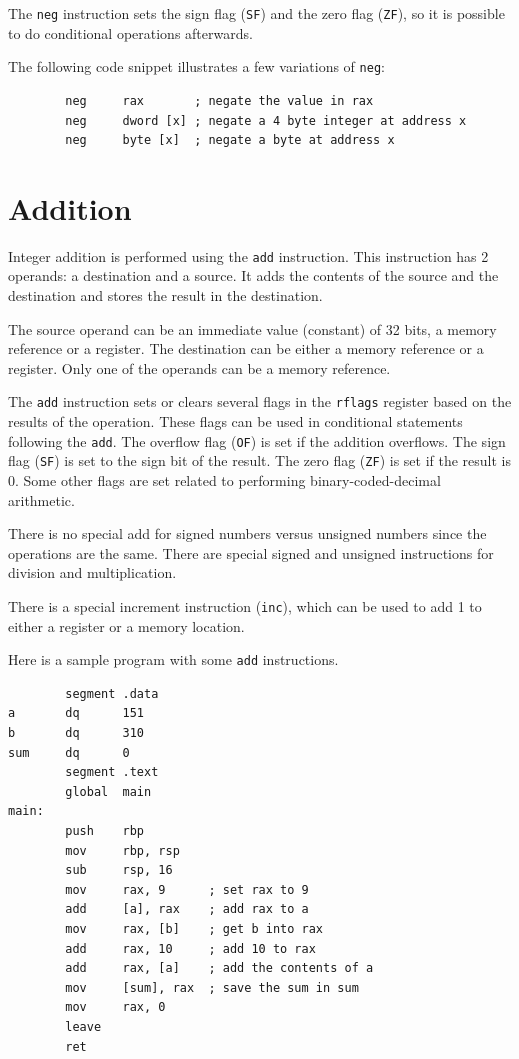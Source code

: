 \documentclass[11pt,b5paper]{book}
\begin{document}
The {\tt neg} instruction sets the sign flag ({\tt SF}) and the zero flag   
({\tt ZF}), so it is possible to do conditional operations afterwards.

The following code snippet illustrates a few variations of {\tt neg}:

\begin{verbatim}
        neg     rax       ; negate the value in rax
        neg     dword [x] ; negate a 4 byte integer at address x
        neg     byte [x]  ; negate a byte at address x
\end{verbatim}

\section{Addition}

Integer addition is performed using the {\tt add} instruction. 
This instruction has 2 operands: a destination and a source.
It adds the contents of the source and the destination and stores the
result in the destination.

The source operand can be an immediate value (constant) of 32 bits, a memory
reference or a register.
The destination can be either a memory reference or a register.
Only one of the operands can be a memory reference.

The {\tt add} instruction sets or clears several flags in the {\tt rflags}  
register based on the results of the operation.
These flags can be used in conditional statements following the {\tt add}.
The overflow flag ({\tt OF}) is set if the addition overflows. 
The sign flag ({\tt SF}) is set to the sign bit of the result. 
The zero flag ({\tt ZF}) is set if the result is 0. 
Some other flags are set related to performing binary-coded-decimal
arithmetic.

There is no special add for signed numbers versus unsigned numbers since
the operations are the same.
There are special signed and unsigned instructions for division and multiplication.

There is a special increment instruction ({\tt inc}), which can be used to 
add 1 to either a register or a memory location.

Here is a sample program with some {\tt add} instructions.
\begin{verbatim}
        segment .data
a       dq      151
b       dq      310
sum     dq      0
        segment .text
        global  main
main:
        push    rbp
        mov     rbp, rsp
        sub     rsp, 16
        mov     rax, 9      ; set rax to 9
        add     [a], rax    ; add rax to a
        mov     rax, [b]    ; get b into rax
        add     rax, 10     ; add 10 to rax
        add     rax, [a]    ; add the contents of a
        mov     [sum], rax  ; save the sum in sum
        mov     rax, 0
        leave
        ret
\end{verbatim}
\end{document}
